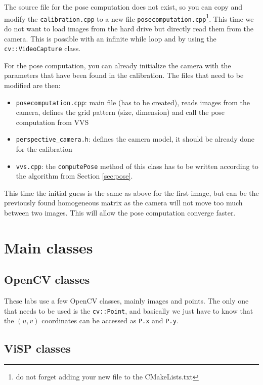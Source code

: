\documentclass{ecnreport}
\begin{document}
The source file for the pose computation does not exist, so you can copy and modify the \texttt{calibration.cpp} to a new file \texttt{posecomputation.cpp}\footnote{do not forget adding your new file 
to the CMakeLists.txt}. This time we do not want to load images from the hard drive but directly read them from the camera. This is possible with an infinite while loop and by using the \texttt{cv::VideoCapture} class.

For the pose computation, you can already initialize the camera with the parameters that have been found in the calibration. The files that need to be modified are then:
\begin{itemize}
 \item \texttt{posecomputation.cpp}: main file (has to be created), reads images from the camera, defines the grid pattern (size, dimension) and call the pose computation from VVS
 \item \texttt{perspective\_camera.h}: defines the camera model, it should be already done for the calibration 
 \item \texttt{vvs.cpp}: the \texttt{computePose} method of this class has to be written according to the algorithm from Section \ref{sec:pose}.
\end{itemize}
This time the initial guess is the same as above for the first image, but can be the previously found homogeneous matrix as the camera will not move too much between two images. This will allow the pose computation
converge faster.

\appendix

\section{Main classes}\label{sec:classes}

\subsection{OpenCV classes}

These labs use a few OpenCV classes, mainly images and points. The only one that needs to be used is the \texttt{cv::Point}, and basically we just have to know that the $(u,v)$ coordinates can be accessed
as \texttt{P.x} and \texttt{P.y}.

\subsection{ViSP classes}
\end{document}
